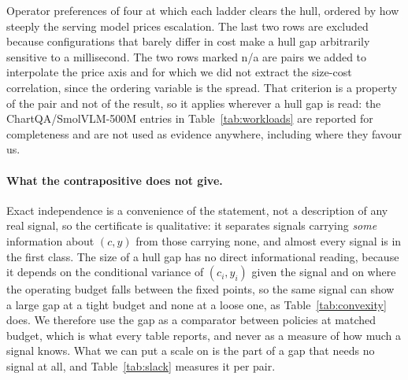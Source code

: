 \documentclass[10pt,twocolumn]{article}
\theoremstyle{plain}
\begin{document}
\noindent Operator preferences of four at which each ladder clears the hull,
ordered by how steeply the serving model prices escalation. The last two rows
are excluded because configurations that barely differ in cost make a hull gap
arbitrarily sensitive to a millisecond. The two rows marked n/a are pairs we
added to interpolate the price axis and for which we did not extract the
size-cost correlation, since the ordering variable is the spread. That
criterion is a property of the
pair and not of the result, so it applies wherever a hull gap is read: the
ChartQA/SmolVLM-500M entries in Table~\ref{tab:workloads} are reported for
completeness and are not used as evidence anywhere, including where they favour
us.

\paragraph{What the contrapositive does not give.} Exact independence is a
convenience of the statement, not a description of any real signal, so the
certificate is qualitative: it separates signals carrying \emph{some}
information about $(c, y)$ from those carrying none, and almost every signal is
in the first class. The size of a hull gap has no direct informational reading,
because it depends on the conditional variance of $(c_i, y_i)$ given the signal
and on where the operating budget falls between the fixed points, so the same
signal can show a large gap at a tight budget and none at a loose one, as
Table~\ref{tab:convexity} does. We therefore use the gap as a comparator
between policies at matched budget, which is what every table reports, and
never as a measure of how much a signal knows. What we can put a scale on is
the part of a gap that needs no signal at all, and
Table~\ref{tab:slack} measures it per pair.
\end{document}
